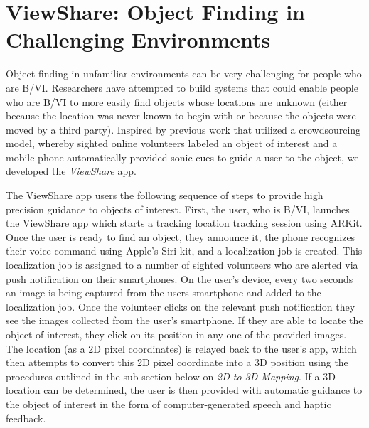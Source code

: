 \documentclass[chi_draft]{sigchi}
\newcommand{\BVI}{B/VI\xspace}
\begin{document}
\section{ViewShare: Object Finding in Challenging Environments}

Object-finding in unfamiliar environments can be very challenging for people who are \BVI {}.  Researchers have attempted to build systems that could enable people who are \BVI to more easily find objects whose locations are unknown (either because the location was never known to begin with or because the objects were moved by a third party).  Inspired by previous work \cite{bigham2010vizwizlocateit} that utilized a crowdsourcing model, whereby sighted online volunteers labeled an object of interest and a mobile phone automatically provided sonic cues to guide a user to the object, we developed the \emph{ViewShare} app.

The ViewShare app users the following sequence of steps to provide high precision guidance to objects of interest.  First, the user, who is \BVI, launches the ViewShare app which starts a tracking location tracking session using ARKit.  Once the user is ready to find an object, they announce it, the phone recognizes their voice command using Apple's Siri kit, and a localization job is created.  This localization job is assigned to a number of sighted volunteers who are alerted via push notification on their smartphones.  On the user's device, every two seconds an image is being captured from the users smartphone and added to the localization job.  Once the volunteer clicks on the relevant push notification they see the images collected from the user's smartphone.  If they are able to locate the object of interest, they click on its position in any one of the provided images.  The location (as a 2D pixel coordinates) is relayed back to the user's app, which then attempts to convert this 2D pixel coordinate into a 3D position using the procedures outlined in the sub section below on \emph{2D to 3D Mapping}.  If a 3D location can be determined, the user is then provided with automatic guidance to the object of interest in the form of computer-generated speech and haptic feedback.
\end{document}
